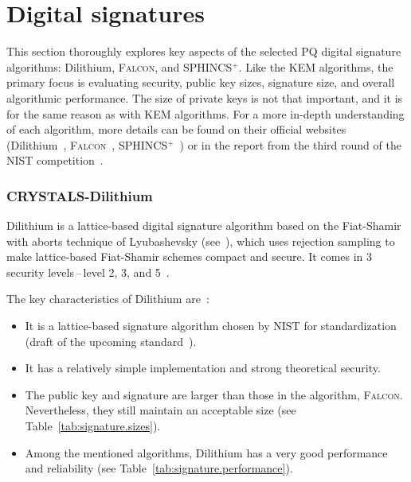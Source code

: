 
\section{Digital signatures}
\label{sec: signatures}

This section thoroughly explores key aspects of the selected PQ digital signature algorithms: Dilithium, \textsc{Falcon}, and SPHINCS$^+$. Like the KEM algorithms, the primary focus is evaluating security, public key sizes, signature size, and overall algorithmic performance. The size of private keys is not that important, and it is for the same reason as with KEM algorithms. For a more in-depth understanding of each algorithm, more details can be found on their official websites (Dilithium~\cite{signature.dilithium}, \textsc{Falcon}~\cite{signature.falcon}, SPHINCS$^+$~\cite{signature.SPHINCS}) or in the report from the third round of the NIST competition~\cite{NIST.round3.report}.

\subsubsection{CRYSTALS-Dilithium}

Dilithium is a lattice-based digital signature algorithm based on the Fiat-Shamir with aborts technique of Lyubashevsky (see~\cite{fiat.shamir}), which uses rejection sampling to make lattice-based Fiat-Shamir schemes compact and secure. It comes in 3 security levels\,--\,level 2, 3, and 5~\cite{NIST.round3.report,signature.dilithium}.

\noindent The key characteristics of Dilithium are~\cite{NIST.round3.report}:

\begin{itemize}
    \item It is a lattice-based signature algorithm chosen by NIST for standardization (draft of the upcoming standard~\cite{signature.man.dilithium}).
    \item It has a relatively simple implementation and strong theoretical security.
    \item The public key and signature are larger than those in the algorithm, \textsc{Falcon}. Nevertheless, they still maintain an acceptable size (see Table~\ref{tab:signature.sizes}).
    \item Among the mentioned algorithms, Dilithium has a very good performance and reliability (see Table~\ref{tab:signature.performance}).
\end{itemize}

